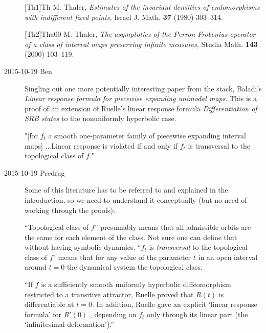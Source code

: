 \begin{description}



[Th1]{Th} M. Thaler, {\it Estimates of the invariant densities of
endomorphisms with indifferent fixed points,}
 Israel J. Math. \textbf{37} (1980) 303--314.

[Th2]{Tha00} M. Thaler,
\emph{The asymptotics of the {Perron-Frobenius} operator of a class of
interval maps preserving infinite measures,}
 Studia Math. \textbf{143} (2000) 103--119.

\item[2015-10-19 Ben] Singling out one more potentially interesting paper from the stack,
Baladi's {\em Linear response formula for piecewise expanding unimodal maps}.
This is a proof of an extension of Ruelle's linear response formula
{\em Differentiation of SRB states} to the nonuniformly hyperbolic case.

"[for $f_{t}$ a smooth one-parameter family of piecewise expanding
interval maps] ...Linear response is violated if and only if $f_{t}$ is
transversal to the topological class of $f$."

\item[2015-10-19 Predrag]
Some of this literature has to be referred to and explained in the
introduction, so we need to understand it conceptually (but no need of
working through the proofs):

``Topological class of $f$'' presumably means that all admissible orbits
are the same for each element of the class. Not sure one can define that
without having symbolic dynamics. ``$f_{t}$ is \emph{transversal} to the
topological class of $f$" means that for any value of the parameter $t$
in an open interval around $t=0$ the dynamical system  the
topological class.

``If $f$ is a sufficiently smooth uniformly hyperbolic diffeomorphism
restricted to a transitive attractor,
Ruelle proved that $R (t)$ is
differentiable at $t = 0$.  In addition, Ruelle gave an explicit `linear
response formula' for $R'( 0 )$ , depending on $f_t$ only through its
linear part (the `infinitesimal deformation').''


\end{description}
